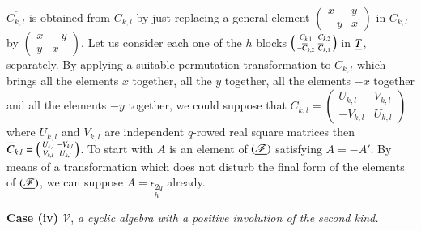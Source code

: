 $\overline{C_{k,l}}$ is obtained from $C_{k,l}$ by just replacing a
general element $\left(\begin{smallmatrix} x & y\\ -y & x
\end{smallmatrix}\right)$ in $C_{k,l}$ by $\left(\begin{smallmatrix} x
  & -y \\ y & x
\end{smallmatrix}\right)$. Let us consider each one of the $h$ blocks
$\left(\begin{smallmatrix} C_{k,1} & C_{k,2}\\ -\overline{C}_{k,2} &
  \overline{C}_{k,1}
\end{smallmatrix}\right)$ in $\underline{T}$, separately. By applying a
suitable permutation-transformation to $C_{k,l}$ which brings all the
elements $x$ together, all the $y$ together, all the elements $-x$
together and all the elements $-y$ together, we could suppose that
$C_{k,l}=
\left(\begin{smallmatrix} U_{k,l} & V_{k,l}\\ -V_{k,l} & U_{k,l}
\end{smallmatrix}\right)$ where $U_{k,l}$ and $V_{k,l}$ are
independent $q$-rowed real square matrices then
$\overline{C}_{k,l}=\left(\begin{smallmatrix} U_{k,l} & -V_{k,l}\\ V_{k,l} &
  U_{k,l}
\end{smallmatrix}\right)$. To start with $A$ is an element of
$(\underline{\mathscr{F}})$ satisfying $A=-A'$. By means of a transformation
which does not disturb the final form of the elements of
$(\underline{\mathscr{F}})$, we can suppose $A=\underset{h}{\epsilon_{2q}}$
already. 

\medskip
\noindent
{\bf Case (iv) {\boldmath$\mathscr{V}$}}, {\em a cyclic algebra with a
  positive involution of the second kind.}

